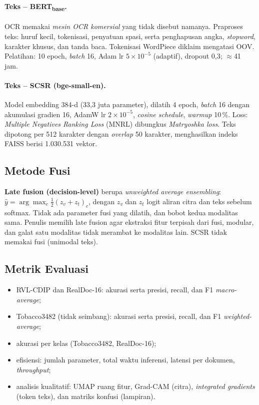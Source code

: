 \paragraph{Teks -- BERT\textsubscript{base}.} OCR memakai \emph{mesin OCR komersial}
yang tidak disebut namanya. Praproses teks: huruf kecil, tokenisasi, penyatuan spasi,
serta penghapusan angka, \emph{stopword}, karakter khusus, dan tanda baca. Tokenisasi
WordPiece diklaim mengatasi OOV. Pelatihan: 10 epoch, \emph{batch} 16, Adam lr
$5\times10^{-5}$ (adaptif), dropout 0,3; $\approx$41 jam.

\paragraph{Teks -- SCSR (bge-small-en).} Model embedding 384-d (33,3 juta parameter),
dilatih 4 epoch, \emph{batch} 16 dengan akumulasi gradien 16, AdamW lr $2\times10^{-5}$,
\emph{cosine schedule}, \emph{warmup} 10\,\%. Loss: \emph{Multiple Negatives Ranking Loss}
(MNRL) dibungkus \emph{Matryoshka loss}. Teks dipotong per 512 karakter dengan
\emph{overlap} 50 karakter, menghasilkan indeks FAISS berisi 1.030.531 vektor.

\subsection{Metode Fusi}
\textbf{Late fusion (decision-level)} berupa \emph{unweighted average ensembling}:
$\hat{y} = \arg\max_c \tfrac{1}{2}(z_v + z_t)_c$, dengan $z_v$ dan $z_t$ logit aliran
citra dan teks sebelum softmax. Tidak ada parameter fusi yang dilatih, dan bobot kedua
modalitas sama. Penulis memilih late fusion agar ekstraksi fitur terpisah dari fusi,
modular, dan galat satu modalitas tidak merambat ke modalitas lain. SCSR tidak memakai
fusi (unimodal teks).

\subsection{Metrik Evaluasi}
\begin{itemize}
  \item RVL-CDIP dan RealDoc-16: akurasi serta presisi, recall, dan F1 \emph{macro-average};
  \item Tobacco3482 (tidak seimbang): akurasi serta presisi, recall, dan F1
        \emph{weighted-average};
  \item akurasi per kelas (Tobacco3482, RealDoc-16);
  \item efisiensi: jumlah parameter, total waktu inferensi, latensi per dokumen,
        \emph{throughput};
  \item analisis kualitatif: UMAP ruang fitur, Grad-CAM (citra), \emph{integrated
        gradients} (token teks), dan matriks konfusi (lampiran).
\end{itemize}

